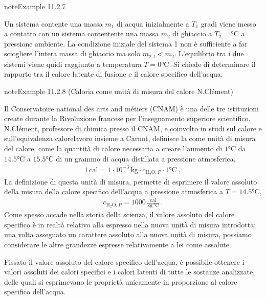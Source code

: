 \documentclass[letterpaper,10pt,italian]{jupyterBook}
\begin{document}
\label{ch/thermodynamics/foundation-experiments:example-7}
\begin{sphinxadmonition}{note}{Example 11.2.7}



\sphinxAtStartPar
Un sistema contente una massa \(m_1\) di acqua inizialmente a \(T_1\) gradi viene messo a contatto con un sistema contentente una massa \(m_2\) di ghiaccio a \(T_2 = \text{°C}\) a pressione ambiente. La condizione iniziale del sistema 1 non è sufficiente a far sciogliere l’intera massa di ghiaccio ma solo \(m_{2,l} < m_2\). L’equilibrio tra i due sistemi viene quidi raggiunto a temperatura \(T=0 \text{°C}\). Si chiede di determinare il rapporto tra il calore latente di fusione e il calore specifico dell’acqua.
\end{sphinxadmonition}
\label{ch/thermodynamics/foundation-experiments:example-8}
\begin{sphinxadmonition}{note}{Example 11.2.8 (Caloria come unità di misura del calore \sphinxhyphen{} N.Clément)}



\sphinxAtStartPar
Il Conservatoire national des arts and métiers (CNAM) è una delle tre istituzioni create durante la Rivoluzione francese per l’insegnamento superiore scientifico. N.Clément, professore di chimica presso il CNAM, e coinvolto in studi sul calore e sull’equivalenza calore\sphinxhyphen{}lavoro insieme a Carnot, definisce la  come unità di misura del calore, come la quantità di calore necessaria a creare l’aumento di \(1 \text{°C}\) da \(14.5 \text{°C}\) a \(15.5 \text{°C}\) di un grammo di acqua distillata a pressione atmosferica,
\begin{equation*}
\begin{split}1 \, \text{cal} = 1 \cdot 10^{-3} \, \text{kg} \cdot c_{\text{H$_2$O},P} \cdot 1 \text{°C} \ ,\end{split}
\end{equation*}
\sphinxAtStartPar
La definizione di questa unità di misura, permette di esprimere il valore assoluto della misura della calore specifico dell’acqua a pressione atmosferica a \(T = 14.5 \text{°C}\),
\begin{equation*}
\begin{split}c_{\text{H$_2$O},P} = 1000 \, \frac{\text{cal}}{\text{kg} \, \text{°C}} \ .\end{split}
\end{equation*}
\sphinxAtStartPar
{} Come spesso accade nella storia della scienza, il valore assoluto del calore specifico è in realtà relativo alla \sphinxhyphen{} espresso nella \sphinxhyphen{} nuova unità di misura introdotta; una volta assegnato un carattere assoluto alla nuova unità di misura, possiamo considerare le altre grandezze espresse relativamente a lei come assolute.

\sphinxAtStartPar
{} Fissato il valore assoluto del calore specifico dell’acqua, è possibile ottenere i valori assoluti dei calori specifici e i calori latenti di tutte le sostanze analizzate, delle quali si esprimevano le proprietà unicamente in proporzione al calore specifico dell’acqua.
\end{sphinxadmonition}
\end{document}
